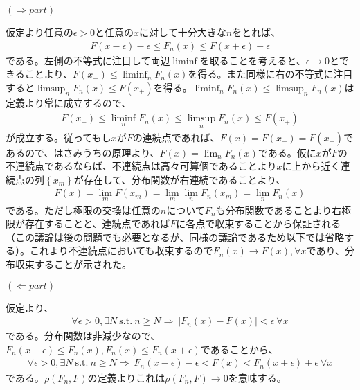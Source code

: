 \documentclass{article}
\begin{document}
\noindent $(\Rightarrow part)$

仮定より任意の$\epsilon > 0$と任意の$x$に対して十分大きな$n$をとれば、
\begin{align*}
	F(x-\epsilon) - \epsilon \leq F_n(x) \leq F(x+\epsilon) + \epsilon
\end{align*}
である。左側の不等式に注目して両辺$\liminf$を取ることを考えると、$\epsilon \to 0$とできることより、$F(x_{-}) \leq \liminf_n F_n(x)$を得る。また同様に右の不等式に注目すると$\limsup_n F_n(x) \leq F(x_{+})$を得る。$\liminf_n F_n(x) \leq \limsup_n F_n(x)$は定義より常に成立するので、
\begin{align*}
	F(x_{-}) \leq \liminf_n F_n(x) \leq \limsup_n F_n(x) \leq F(x_{+})
\end{align*}
が成立する。従ってもし$x$が$F$の連続点であれば、$F(x) = F(x_{-}) = F(x_{+})$であるので、はさみうちの原理より、$F(x) = \lim_n F_n(x)$である。仮に$x$が$F$の不連続点であるならば、不連続点は高々可算個であることより$x$に上から近く連続点の列$\left\{ x_m \right\}$が存在して、分布関数が右連続であることより、
\begin{align*}
	F(x) = \lim_m F(x_m) = \lim_m \lim_n F_n(x_m) = \lim_n F_n(x)
\end{align*}
である。ただし極限の交換は任意の$n$について$F_n$も分布関数であることより右極限が存在することと、連続点であれば$F$に各点で収束することから保証される（この議論は後の問題でも必要となるが、同様の議論であるため以下では省略する）。これより不連続点においても収束するので$F_n(x) \to F(x), \forall x$であり、分布収束することが示された。

\noindent $(\Leftarrow part)$

仮定より、
\begin{align*}
	\forall \epsilon > 0, \exists N\ \text{s.t.}\ n\geq N \Rightarrow\ \left| F_n(x) - F(x) \right| < \epsilon\ \forall x
\end{align*}
である。分布関数は非減少なので、$F_n(x-\epsilon) \leq F_n(x), F_n(x) \leq F_n(x+\epsilon)$であることから、
\begin{align*}
	\forall \epsilon > 0, \exists N\ \text{s.t.}\ n\geq N \Rightarrow\ F_n(x-\epsilon) - \epsilon < F(x) < F_n(x+\epsilon) + \epsilon\ \forall x
\end{align*}
である。$\rho(F_n, F)$の定義よりこれは$\rho(F_n, F) \to 0$を意味する。
\end{document}
